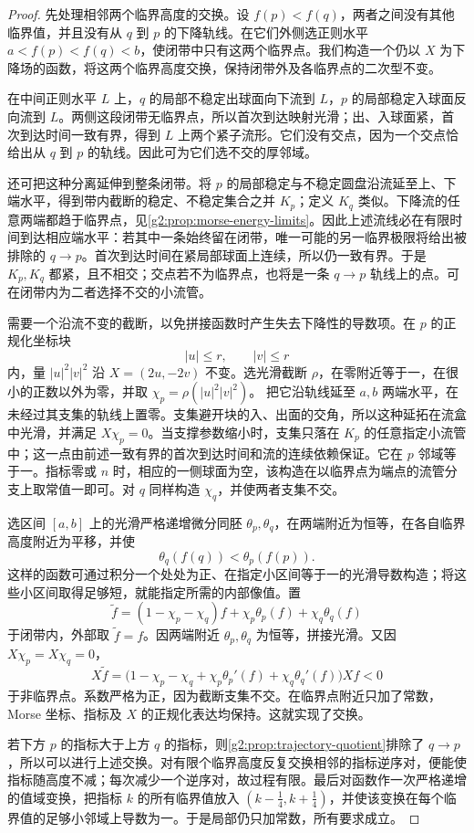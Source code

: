 \begin{proof}
	先处理相邻两个临界高度的交换。设 \(f(p)<f(q)\)，两者之间没有其他临界值，并且没有从 \(q\) 到 \(p\) 的下降轨线。在它们外侧选正则水平 \(a<f(p)<f(q)<b\)，使闭带中只有这两个临界点。我们构造一个仍以 \(X\) 为下降场的函数，将这两个临界高度交换，保持闭带外及各临界点的二次型不变。

	在中间正则水平 \(L\) 上，\(q\) 的局部不稳定出球面向下流到 \(L\)，\(p\) 的局部稳定入球面反向流到 \(L\)。两侧这段闭带无临界点，所以首次到达映射光滑；出、入球面紧，首次到达时间一致有界，得到 \(L\) 上两个紧子流形。它们没有交点，因为一个交点恰给出从 \(q\) 到 \(p\) 的轨线。因此可为它们选不交的厚邻域。

	还可把这种分离延伸到整条闭带。将 \(p\) 的局部稳定与不稳定圆盘沿流延至上、下端水平，得到带内截断的稳定、不稳定集合之并 \(K_p\)；定义 \(K_q\) 类似。下降流的任意两端都趋于临界点，见\cref{g2:prop:morse-energy-limits}。因此上述流线必在有限时间到达相应端水平：若其中一条始终留在闭带，唯一可能的另一临界极限将给出被排除的 \(q\to p\)。首次到达时间在紧局部球面上连续，所以仍一致有界。于是 \(K_p,K_q\) 都紧，且不相交；交点若不为临界点，也将是一条 \(q\to p\) 轨线上的点。可在闭带内为二者选择不交的小流管。

	需要一个沿流不变的截断，以免拼接函数时产生失去下降性的导数项。在 \(p\) 的正规化坐标块
	\[
		|u|\le r,\qquad |v|\le r
	\]
	内，量 \(|u|^2|v|^2\) 沿 \(X=(2u,-2v)\) 不变。选光滑截断 \(\rho\)，在零附近等于一，在很小的正数以外为零，并取
	\(\chi_p=\rho(|u|^2|v|^2)\)。
	把它沿轨线延至 \(a,b\) 两端水平，在未经过其支集的轨线上置零。支集避开块的入、出面的交角，所以这种延拓在流盒中光滑，并满足 \(X\chi_p=0\)。当支撑参数缩小时，支集只落在 \(K_p\) 的任意指定小流管中；这一点由前述一致有界的首次到达时间和流的连续依赖保证。它在 \(p\) 邻域等于一。指标零或 \(n\) 时，相应的一侧球面为空，该构造在以临界点为端点的流管分支上取常值一即可。对 \(q\) 同样构造 \(\chi_q\)，并使两者支集不交。

	选区间 \([a,b]\) 上的光滑严格递增微分同胚 \(\theta_p,\theta_q\)，在两端附近为恒等，在各自临界高度附近为平移，并使
	\[
		\theta_q(f(q))<\theta_p(f(p)).
	\]
	这样的函数可通过积分一个处处为正、在指定小区间等于一的光滑导数构造；将这些小区间取得足够短，就能指定所需的内部像值。置
	\[
		\widetilde f
		=(1-\chi_p-\chi_q)f+\chi_p\theta_p(f)+\chi_q\theta_q(f)
	\]
	于闭带内，外部取 \(\widetilde f=f\)。因两端附近 \(\theta_p,\theta_q\) 为恒等，拼接光滑。又因 \(X\chi_p=X\chi_q=0\)，
	\[
		X\widetilde f=
		\bigl(1-\chi_p-\chi_q+\chi_p\theta_p'(f)+\chi_q\theta_q'(f)\bigr)Xf<0
	\]
	于非临界点。系数严格为正，因为截断支集不交。在临界点附近只加了常数，Morse 坐标、指标及 \(X\) 的正规化表达均保持。这就实现了交换。

	若下方 \(p\) 的指标大于上方 \(q\) 的指标，则\cref{g2:prop:trajectory-quotient}排除了 \(q\to p\)，所以可以进行上述交换。对有限个临界高度反复交换相邻的指标逆序对，便能使指标随高度不减；每次减少一个逆序对，故过程有限。最后对函数作一次严格递增的值域变换，把指标 \(k\) 的所有临界值放入 \((k-\frac14,k+\frac14)\)，并使该变换在每个临界值的足够小邻域上导数为一。于是局部仍只加常数，所有要求成立。
\end{proof}

